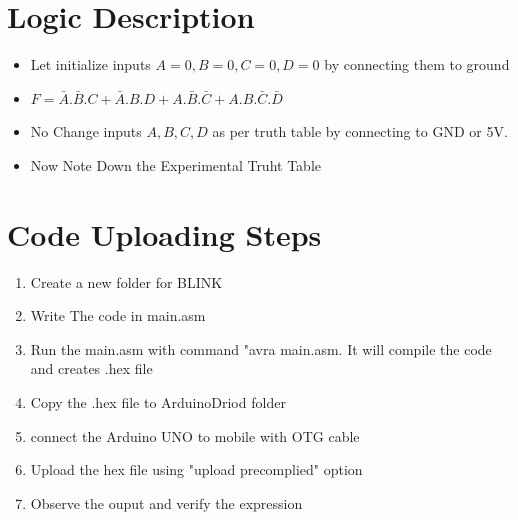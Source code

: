 \documentclass[a4paper,12pt]{article}
\begin{document}
\section*{Logic Description}
\begin{itemize}
        \item Let initialize inputs $A=0,B=0,C=0,D=0$ by connecting them to ground
        \item $F = \bar{A}.\bar{B}.C + \bar{A}.B.D + A.\bar{B}.\bar{C} + A.B.\bar{C}.\bar{D} $
	\item No Change inputs $A,B,C,D$ as per truth table by connecting to GND or 5V.
	\item Now Note Down the Experimental Truht Table
\end{itemize}
\section*{Code Uploading Steps}
\begin{enumerate}
        \item Create a new folder for BLINK
        \item Write The code in main.asm
        \item Run the main.asm with command "avra main.asm. It will compile the code and creates .hex file
        \item Copy the .hex file to ArduinoDriod folder
        \item connect the Arduino UNO to mobile with OTG cable
        \item Upload the hex file using "upload precomplied" option
        \item Observe the ouput and verify the expression
\end{enumerate}
\end{document}

